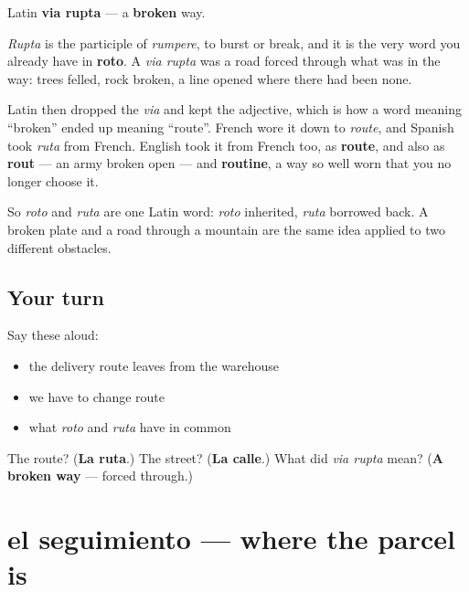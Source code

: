 \begin{cousinweb}
Latin \textbf{via rupta} — a \textbf{broken} way.

\emph{Rupta} is the participle of \emph{rumpere}, to burst or break, and it is the very word you already have in \textbf{roto}. A \emph{via rupta} was a road forced through what was in the way: trees felled, rock broken, a line opened where there had been none.

Latin then dropped the \emph{via} and kept the adjective, which is how a word meaning \textquotedblleft{}broken\textquotedblright{} ended up meaning \textquotedblleft{}route\textquotedblright{}. French wore it down to \emph{route}, and Spanish took \emph{ruta} from French. English took it from French too, as \textbf{route}, and also as \textbf{rout} — an army broken open — and \textbf{routine}, a way so well worn that you no longer choose it.

So \emph{roto} and \emph{ruta} are one Latin word: \emph{roto} inherited, \emph{ruta} borrowed back. A broken plate and a road through a mountain are the same idea applied to two different obstacles.
\end{cousinweb}

\subsection*{Your turn}
Say these aloud:

\begin{itemize}
\raggedright
  \item the delivery route leaves from the warehouse
  \item we have to change route
  \item what \emph{roto} and \emph{ruta} have in common
\end{itemize}

\begin{tcolorbox}[breakable,colback=teal!4,colframe=teal!35!black,title={Before you move on}]
The route? (\textbf{La ruta}.) The street? (\textbf{La calle}.) What did \emph{via rupta} mean? (\textbf{A broken way} — forced through.)
\end{tcolorbox}
\section[el seguimiento]{el seguimiento — where the parcel is}

\label{lesson:ES-C452-seguimiento}



